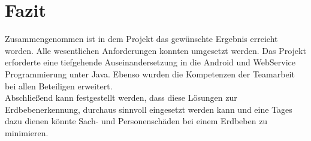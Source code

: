 \section{Fazit}
Zusammengenommen ist in dem Projekt das gewünschte Ergebnis erreicht worden. Alle wesentlichen Anforderungen konnten umgesetzt werden. Das Projekt erforderte eine tiefgehende Auseinandersetzung in die Android und WebService Programmierung unter Java. Ebenso wurden die Kompetenzen der Teamarbeit bei allen Beteiligen erweitert.\\
Abschließend kann festgestellt werden, dass diese Lösungen zur Erdbebenerkennung, durchaus sinnvoll eingesetzt werden kann und eine Tages dazu dienen könnte Sach- und Personenschäden bei einem Erdbeben zu minimieren.